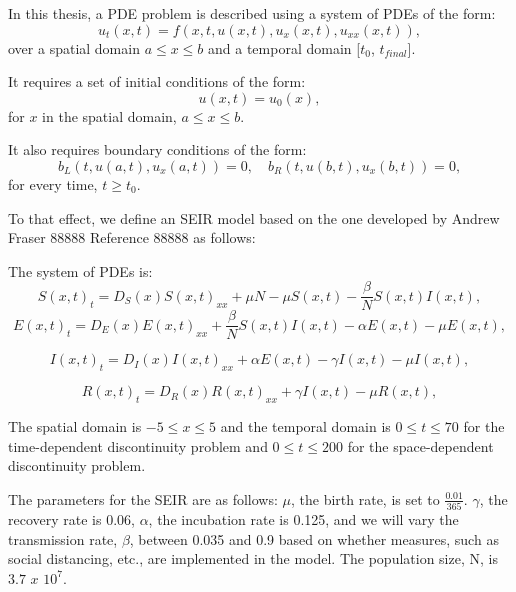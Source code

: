 \documentclass{article}
\begin{document}
In this thesis, a PDE problem is described using a system of PDEs of the form:
\begin{equation}
u_t(x, t) = f(x, t, u(x,t), u_x(x,t), u_{xx}(x,t)),
\end{equation} 
over a spatial domain ${a \leq x \leq b}$ and a temporal domain [${t_0}$, $t_{final}$]. 

It requires a set of initial conditions of the form:
\begin{equation}
u(x, t) = u_0(x),
\end{equation}
for $x$ in the spatial domain, ${a \leq x \leq b}$.

It also requires boundary conditions of the form:
\begin{equation}
b_L(t, u(a,t), u_x(a,t)) = 0, \quad b_R(t, u(b,t), u_x(b,t)) = 0,
\end{equation} 
for every time, $t \geq t_0$.

To that effect, we define an SEIR model based on the one developed by Andrew Fraser 88888 Reference 88888 as follows:

The system of PDEs is:
\begin{equation}
S(x, t)_t = D_S(x)S(x, t)_{xx} + \mu N - \mu S(x, t) - \frac{\beta}{N}S(x, t)I(x, t),
\end{equation}
\begin{equation}
E(x, t)_t = D_E(x)E(x, t)_{xx} + \frac{\beta}{N}S(x, t)I(x, t) - \alpha E(x, t) - \mu E(x, t),
\end{equation}

\begin{equation}
I(x, t)_t = D_I(x)I(x, t)_{xx} + \alpha E(x, t) - \gamma I(x, t) - \mu I(x, t),
\end{equation}

\begin{equation}
R(x, t)_t = D_R(x)R(x, t)_{xx} + \gamma I(x, t) - \mu R(x, t),
\end{equation} 

The spatial domain is $-5 \leq x \leq 5$ and the temporal domain is $0 \leq t \leq 70$ for the time-dependent discontinuity problem and $0 \leq t \leq 200$ for the space-dependent discontinuity problem.

The parameters for the SEIR are as follows: $\mu$, the birth rate, is set to $\frac{0.01}{365}$. $\gamma$, the recovery rate is 0.06, $\alpha$, the incubation rate is 0.125, and we will vary the transmission rate, $\beta$, between 0.035 and 0.9 based on whether measures, such as social distancing, etc., are implemented in the model. The population size, N, is $3.7$ $x$ $10^{7}$.
\end{document}
